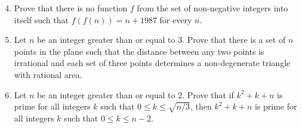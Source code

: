\documentclass[12pt]{article}
\begin{document}
\begin{enumerate}
\setcounter{enumi}{3}
\item
Prove that there is no function $f$ from the set of non-negative integers into
itself such that $f(f(n)) = n + 1987$ for every $n$.

\item
Let $n$ be an integer greater than or equal to 3.  Prove that there is a set of
$n$ points in the plane such that the distance between any two points is
irrational and each set of three points determines a non-degenerate triangle
with rational area.

\item
Let $n$ be an integer greater than or equal to 2.  Prove that if $k^2 + k + n$
is prime for all integers $k$ such that $0 \leq k \leq \sqrt{n/3}$, then $k^2 +
k + n$ is prime for all integers $k$ such that $0 \leq k \leq n - 2$.
\end{enumerate}
\end{document}
